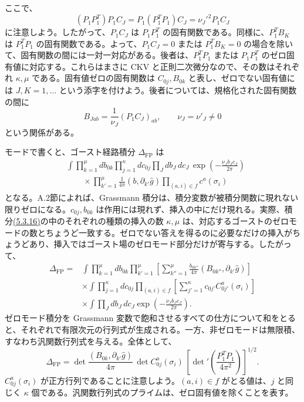 ここで、
\begin{equation}
(P_1P_1^T)P_1C_J
=P_1(P_1^TP_1)C_J=\nu_J'^2P_1C_J
\tag{5.3.14}\label{eq:5.3.14}
\end{equation}
に注意しよう。したがって、$P_1C_J$ は $P_1P_1^T$ の固有関数である。同様に、$P_1^TB_K$ は $P_1^TP_1$ の固有関数である。よって、$P_1C_J=0$ または $P_1^TB_K=0$ の場合を除いて、固有関数の間には一対一対応がある。後者は、$P_1^TP_1$ または $P_1P_1^T$ のゼロ固有値に対応する。これらはまさに CKV と正則二次微分なので、その数はそれぞれ $\kappa,\mu$ である。固有値ゼロの固有関数は $C_{0j},B_{0k}$ と表し、ゼロでない固有値には $J,K=1,\ldots$ という添字を付けよう。後者については、規格化された固有関数の間に
\begin{equation}
B_{Jab}=\frac1{\nu_J}(P_1C_J)_{ab},\qquad
\nu_J=\nu'_J\ne0
\tag{5.3.15}\label{eq:5.3.15}
\end{equation}
という関係がある。

モードで書くと、ゴースト経路積分 $\Delta_{\mathrm{FP}}$ は
\begin{equation}
\begin{aligned}
&\int\prod_{k=1}^{\mu}db_{0k}
\prod_{j=1}^{\kappa}dc_{0j}
\prod_Jdb_J\,dc_J\,
\exp\left(-\frac{\nu_Jb_Jc_J}{2\pi}\right)\\
&\qquad\times\prod_{k'=1}^{\mu}\frac1{4\pi}(b,\partial_{k'}\hat g)
\prod_{(a,i)\in f}c^a(\sigma_i)
\end{aligned}
\tag{5.3.16}\label{eq:5.3.16}
\end{equation}
となる。A.2節によれば、Grassmann 積分は、積分変数が被積分関数に現れない限りゼロになる。$c_{0j},b_{0k}$ は作用には現れず、挿入の中にだけ現れる。実際、積分\hyperref[eq:5.3.16]{(5.3.16)}の中のそれぞれの種類の挿入の数 $\kappa,\mu$ は、対応するゴーストのゼロモードの数とちょうど一致する。ゼロでない答えを得るのに必要なだけの挿入がちょうどあり、挿入ではゴースト場のゼロモード部分だけが寄与する。したがって、
\begin{equation}
\begin{aligned}
\Delta_{\mathrm{FP}}
={}&\int\prod_{k=1}^{\mu}db_{0k}
\prod_{k'=1}^{\mu}\left[
\sum_{k''=1}^{\mu}\frac{b_{0k''}}{4\pi}
(B_{0k''},\partial_{k'}\hat g)\right]\\
&\times\int\prod_{j=1}^{\kappa}dc_{0j}
\prod_{(a,i)\in f}\left[
\sum_{j'=1}^{\kappa}c_{0j'}C_{0j'}^a(\sigma_i)\right]\\
&\times\int\prod_Jdb_J\,dc_J
\exp\left(-\frac{\nu_Jb_Jc_J}{2\pi}\right).
\end{aligned}
\tag{5.3.17}\label{eq:5.3.17}
\end{equation}
ゼロモード積分を Grassmann 変数で飽和させるすべての仕方について和をとると、それぞれで有限次元の行列式が生成される。一方、非ゼロモードは無限積、すなわち汎関数行列式を与える。全体として、
\begin{equation}
\Delta_{\mathrm{FP}}
=\det\frac{(B_{0k},\partial_{k'}\hat g)}{4\pi}\,
\det C_{0j}^a(\sigma_i)\,
\left[\det{}'\left(\frac{P_1^TP_1}{4\pi^2}\right)\right]^{1/2}.
\tag{5.3.18}\label{eq:5.3.18}
\end{equation}
$C_{0j}^a(\sigma_i)$ が正方行列であることに注意しよう。$(a,i)\in f$ がとる値は、$j$ と同じく $\kappa$ 個である。汎関数行列式のプライムは、ゼロ固有値を除くことを表す。

